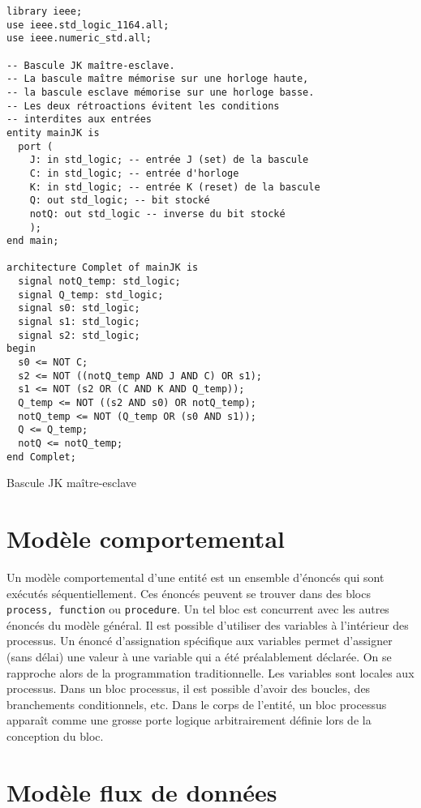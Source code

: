 \documentclass[letter, oneside]{book}
\begin{document}
\begin{listing}[htbp]
\begin{verbatim}
library ieee;
use ieee.std_logic_1164.all;
use ieee.numeric_std.all;

-- Bascule JK maître-esclave.
-- La bascule maître mémorise sur une horloge haute, 
-- la bascule esclave mémorise sur une horloge basse. 
-- Les deux rétroactions évitent les conditions 
-- interdites aux entrées 
entity mainJK is
  port (
    J: in std_logic; -- entrée J (set) de la bascule
    C: in std_logic; -- entrée d'horloge
    K: in std_logic; -- entrée K (reset) de la bascule
    Q: out std_logic; -- bit stocké
    notQ: out std_logic -- inverse du bit stocké
    );
end main;

architecture Complet of mainJK is
  signal notQ_temp: std_logic;
  signal Q_temp: std_logic;
  signal s0: std_logic;
  signal s1: std_logic;
  signal s2: std_logic;
begin
  s0 <= NOT C;
  s2 <= NOT ((notQ_temp AND J AND C) OR s1);
  s1 <= NOT (s2 OR (C AND K AND Q_temp));
  Q_temp <= NOT ((s2 AND s0) OR notQ_temp);
  notQ_temp <= NOT (Q_temp OR (s0 AND s1));
  Q <= Q_temp;
  notQ <= notQ_temp;
end Complet;
\end{verbatim}
\caption{Bascule JK maître-esclave}
\end{listing}

\section{Modèle comportemental}
\label{sec:orgf6467a0}

Un modèle comportemental d'une entité est un ensemble d'énoncés qui
sont exécutés séquentiellement. Ces énoncés peuvent se trouver dans
des blocs \texttt{process, function} ou \texttt{procedure}. Un tel bloc est concurrent
avec les autres énoncés du modèle général. Il est possible d'utiliser
des variables à l'intérieur des processus. Un énoncé d'assignation
spécifique aux variables permet d'assigner (sans délai) une valeur à
une variable qui a été préalablement déclarée. On se rapproche alors
de la programmation traditionnelle. Les variables sont locales aux
processus. Dans un bloc processus, il est possible d'avoir des
boucles, des branchements conditionnels, etc. Dans le corps de
l'entité, un bloc processus apparaît comme une grosse porte logique
arbitrairement définie lors de la conception du bloc.

\section{Modèle flux de données}
\label{sec:org9176bce}
\end{document}
